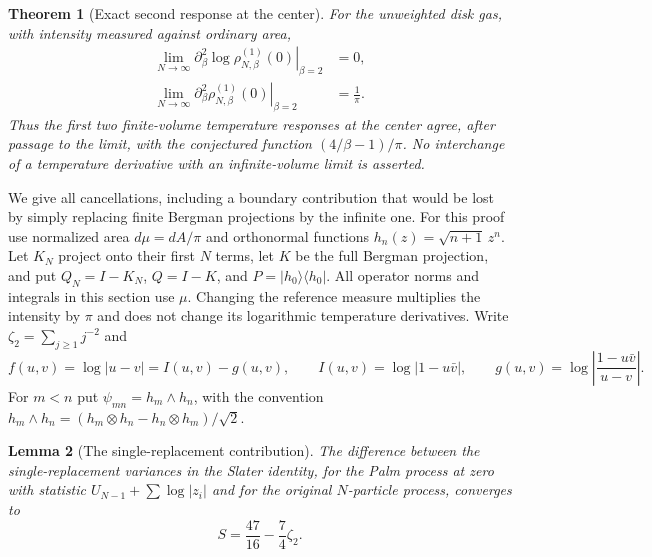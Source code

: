 \documentclass[11pt,a4paper]{article}
\numberwithin{equation}{section}
\newtheorem{theorem}{Theorem}[section]
\newtheorem{lemma}[theorem]{Lemma}
\theoremstyle{definition}
\theoremstyle{remark}
\begin{document}
\begin{theorem}[Exact second response at the center]
\label{thm:beta2-exact-second-center}
For the unweighted disk gas, with intensity measured against ordinary
area,
\begin{align}
 \lim_{N\to\infty}\left.\partial_\beta^2
       \log\rho_{N,\beta}^{(1)}(0)\right|_{\beta=2}&=0,
       \label{eq:beta2-exact-second-log-center}\\
 \lim_{N\to\infty}\left.\partial_\beta^2
       \rho_{N,\beta}^{(1)}(0)\right|_{\beta=2}&=\frac1\pi.
       \label{eq:beta2-exact-second-center}
\end{align}
Thus the first two finite-volume temperature responses at the center
agree, after passage to the limit, with the conjectured function
$(4/\beta-1)/\pi$.  No interchange of a temperature derivative with
an infinite-volume limit is asserted.
\end{theorem}

We give all cancellations, including a boundary contribution that
would be lost by simply replacing finite Bergman projections by the
infinite one.  For this proof use normalized area $d\mu=dA/\pi$ and
orthonormal functions $h_n(z)=\sqrt{n+1}\,z^n$.  Let $K_N$ project onto
their first $N$ terms, let $K$ be the full Bergman projection, and put
$Q_N=I-K_N$, $Q=I-K$, and $P=|h_0\rangle\langle h_0|$.
All operator norms and integrals in this section use $\mu$.
Changing the reference measure multiplies the intensity by $\pi$ and
does not change its logarithmic temperature derivatives.
Write $\zeta_2=\sum_{j\ge1}j^{-2}$ and
\[
 f(u,v)=\log|u-v|=I(u,v)-g(u,v),\qquad
 I(u,v)=\log|1-u\bar v|,\qquad
 g(u,v)=\log\left|\frac{1-u\bar v}{u-v}\right|.
\]
For $m<n$ put $\psi_{mn}=h_m\wedge h_n$, with the convention
$h_m\wedge h_n=(h_m\otimes h_n-h_n\otimes h_m)/\sqrt2$.

\begin{lemma}[The single-replacement contribution]
\label{lem:beta2-exact-center-single}
The difference between the single-replacement variances in the
Slater identity, for the Palm process at zero with statistic
$U_{N-1}+\sum\log|z_i|$ and for the original $N$-particle process,
converges to
\[
 S=\frac{47}{16}-\frac74\zeta_2.
\]
\end{lemma}
\end{document}
